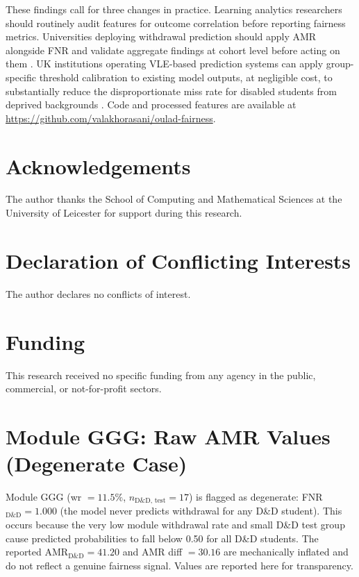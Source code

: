 \documentclass[12pt,a4paper]{article}
\begin{document}
These findings call for three changes in practice. Learning analytics
researchers should routinely audit features for outcome correlation
\citep{kaufman2012} before reporting fairness metrics. Universities deploying
withdrawal prediction should apply AMR alongside FNR and validate aggregate
findings at cohort level before acting on them \citep{gardner2018}. UK
institutions operating VLE-based prediction systems can apply group-specific
threshold calibration to existing model outputs, at negligible cost, to
substantially reduce the disproportionate miss rate for disabled students from
deprived backgrounds \citep{equalityact2010}. Code and processed features are
available at \url{https://github.com/valakhorasani/oulad-fairness}.

\section*{Acknowledgements}

The author thanks the School of Computing and Mathematical Sciences at the
University of Leicester for support during this research.

\section*{Declaration of Conflicting Interests}

The author declares no conflicts of interest.

\section*{Funding}

This research received no specific funding from any agency in the public,
commercial, or not-for-profit sectors.

\appendix

\section{Module GGG: Raw AMR Values (Degenerate Case)}
\label{app:ggg}

Module GGG (wr $= 11.5\%$, $n_{\text{D\&D, test}} = 17$) is flagged as
degenerate: FNR$_{\text{D\&D}} = 1.000$ (the model never predicts withdrawal
for any D\&D student). This occurs because the very low module withdrawal rate
and small D\&D test group cause predicted probabilities to fall below 0.50 for
all D\&D students. The reported AMR$_{\text{D\&D}} = 41.20$ and AMR diff
$= 30.16$ are mechanically inflated and do not reflect a genuine fairness
signal. Values are reported here for transparency.
\end{document}
